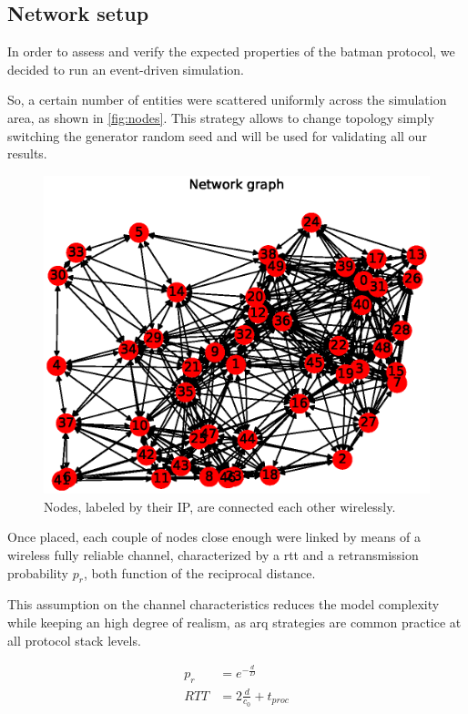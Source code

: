 \documentclass[conference]{IEEEtran}
\begin{document}
\subsection{Network setup}

In order to assess and verify the expected properties of the \gls{batman}
protocol, we decided to run an event-driven simulation.

So, a certain number of entities were scattered uniformly across the simulation
area, as shown in \autoref{fig:nodes}. This strategy allows to change topology
simply switching the generator random seed and will be used for validating all our results.

\begin{figure}[h]
  \centering
  \hspace{-0.7cm}%
  \includegraphics[width=1.1\linewidth]{figures/example_graph}
  \caption{Nodes, labeled by their IP, are connected each other wirelessly.}
  \label{fig:nodes}
\end{figure}

Once placed, each couple of nodes close enough were linked by means of a
wireless fully reliable channel, characterized by a \gls{rtt} and a
retransmission probability $p_r$, both function of the reciprocal distance.

This assumption on the channel characteristics reduces the model complexity
while keeping an high degree of realism, as \gls{arq} strategies are common
practice at all protocol stack levels.

\begin{equation}
  \begin{split}
    p_r & = e^{-\frac{d}{D}} \\
    RTT &= 2 \frac{d}{c_0} + t_{proc}
  \end{split}
\end{equation}
\end{document}
